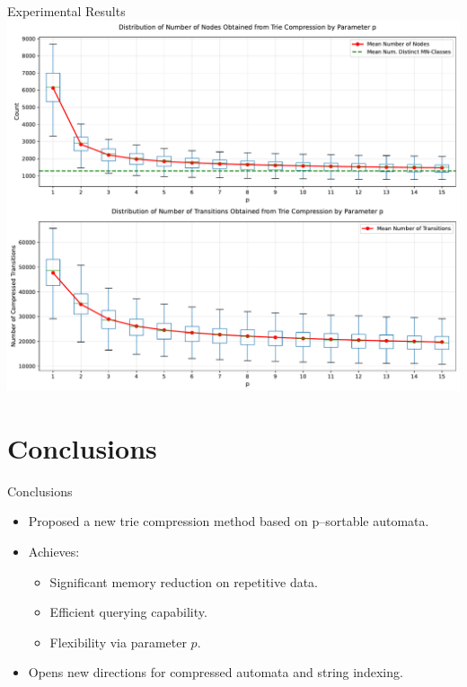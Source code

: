 \documentclass[aspectratio=169]{beamer}
\begin{document}
\begin{frame}{Experimental Results}
  \centering
  \includegraphics[width=1\textwidth]{img/tree_compression_analysis_high_b.pdf}
\end{frame}


\section{Conclusions}
\begin{frame}{Conclusions}
  \begin{itemize}
    \item Proposed a new trie compression method based on p–sortable automata.
    \item Achieves:
      \begin{itemize}
        \item Significant memory reduction on repetitive data.
        \item Efficient querying capability.
        \item Flexibility via parameter $p$.
      \end{itemize}
    \item Opens new directions for compressed automata and string indexing.
  \end{itemize}
\end{frame}
\end{document}
